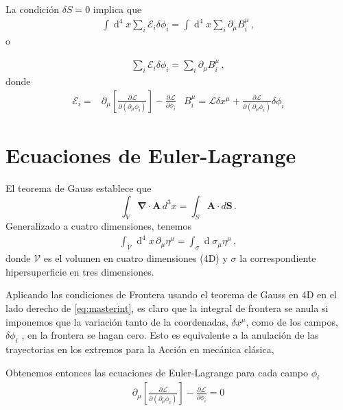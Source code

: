 \begin{frame}
La condición $\delta S=0$ implica que
\begin{align}
\label{eq:masterint}
\int \operatorname{d}^4x  \sum_i \mathcal{E}_i \delta\phi_i =\int \operatorname{d}^4x \sum_i \partial_{\mu} B^{\mu}_{i}\,,
\end{align}
o

\begin{align}
  \sum_i \mathcal{E}_i \delta\phi_i = \sum_i \partial_{\mu} B^{\mu}_{i}\,,
\end{align}
donde
\begin{align}
\label{eq:master2}
  \mathcal{E}_i=&\partial_{\mu} \left[ \frac{\partial\mathcal{L}}{\partial(\partial_{\mu}\phi_i)}\right]-\frac{\partial\mathcal{L}}{\partial\phi_i} & B^{\mu}_i=\mathcal{L} \delta x^{\mu} + \frac{\partial\mathcal{L}}{\partial(\partial_{\mu}\phi_i)}\delta\phi_{i} 
\end{align}
\end{frame}

\section{Ecuaciones de Euler-Lagrange}
El teorema de Gauss establece que
\begin{equation}
\int_V\boldsymbol{\nabla}\cdot\mathbf{A}\,d^3x=
 \int_S\mathbf{A}\cdot d\mathbf{S}\,.
\end{equation}
Generalizado a cuatro dimensiones, tenemos
\begin{align}
\int_{\mathcal{V}} \operatorname{d}^4x\,\partial_{\mu} \eta^{\mu}=
\int_{\sigma} \operatorname{d}\sigma_{\mu} \eta^{\mu}\,,   
\end{align}
donde $\mathcal{V}$ es el volumen en cuatro dimensiones (4D) y $\sigma$ la correspondiente hipersuperficie en tres dimensiones.

Aplicando las condiciones de Frontera usando  el teorema de Gauss en 4D en el lado derecho de \eqref{eq:masterint},
es claro que la integral de frontera se anula si imponemos que la variación tanto de la coordenadas, $\delta x^{\mu}$, como de los campos, $\delta \phi_{i}$ , en la frontera se hagan cero. Esto es equivalente a la anulación de las trayectorias en los extremos para la Acción en mecánica clásica, 

Obtenemos entonces las ecuaciones de Euler-Lagrange para cada campo $\phi_i$
\begin{align}
\label{eq:eelcallfmu}
  \partial_{\mu} \left[ \frac{\partial\mathcal{L}}{\partial(\partial_{\mu}\phi_i)}\right]-\frac{\partial\mathcal{L}}{\partial\phi_i}=0
\end{align}

